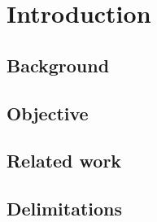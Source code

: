 \chapter{Introduction}

\section{Background}


\section{Objective}

\section{Related work}



\section{Delimitations}
